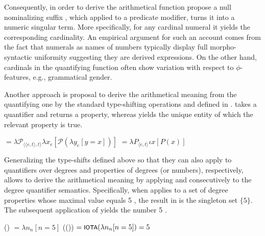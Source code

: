 \documentclass[output=paper]{langscibook}
\begin{document}
        \ea\label{ex:wise-wisdom} 
        \z
        \z
                
        \ea\label{ex:five-being-five-in-number} 
        \z
        \z        

        \noindent Consequently, in order to derive the arithmetical function \citet[][26--27]{ionin_matushansky2018cardinals} propose a null nominalizing suffix , which applied to a predicate modifier, turns it into a numeric singular term. More specifically, for any cardinal numeral it yields the corresponding cardinality. An empirical argument for such an account comes from the fact that numerals as names of numbers typically display full morpho-syntactic uniformity suggesting they are derived expressions. On the other hand, cardinals in the quantifying function often show variation with respect to $\phi$-features, e.g., grammatical gender.
 
	Another approach is  proposal to derive the arithmetical meaning from the quantifying one by the standard type-shifting operations  and  defined in  \citep{partee87}.  takes a quantifier and returns a property, whereas  yields the unique entity of which the relevant property is true.
	
		\ea \label{ex:be-iota} \ea {} $=\lambda\mathcal{P}_{\langle\langle e,t\rangle,t\rangle}\lambda x_e[\mathcal{P}(\lambda y_e[y=x])]$\label{ex:be}
        \ex {} $= \lambda P_{\langle e,t\rangle}\iota x[P(x)]$\label{ex:iota}
        \z
        \z

\noindent Generalizing the type-shifts defined above so that they can also apply to quantifiers over degrees and properties of degrees (or numbers), respectively, allows to derive the arithmetical meaning by applying  and  consecutively to the degree quantifier semantics. Specifically, when  applies to a set of degree properties whose maximal value equals 5 , the result in  is the singleton set $\{5\}$. The subsequent application of  yields the number 5 . 

		\ea \ea {}() $=\lambda n_n[n=5]$\label{ex:be-five}
        \ex {}(()) $= \cnst{iota}(\lambda n_n[n=5]) = 5$\label{ex:iota-be-five}
        \z
        \z
\end{document}
